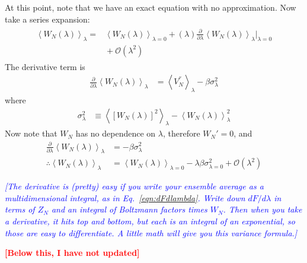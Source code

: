 \documentclass[letterpaper,twocolumn,amsmath,amssymb,prb]{revtex4-1}
\newcommand{\1}{\ensuremath{\textbf{r}_1}}
\newcommand{\2}{\ensuremath{\textbf{r}_2}}
\newcommand{\3}{\ensuremath{\textbf{r}_3}}
\newcommand{\4}{\ensuremath{\textbf{r}_4}}
\newcommand{\fixme}[1]{\textcolor{red}{\textbf{[#1]}}}
\newcommand{\davidsays}[1]{\textcolor{blue}{\textit{[#1]}}}
\begin{document}
At this point, note that we have an exact equation with no approximation. Now take a series expansion:
\begin{align}\begin{split} %
  \left\langle W_N(\lambda) \right\rangle_\lambda = &{} \left\langle W_N(\lambda)\right\rangle_{\lambda = 0} + (\lambda)\frac{\partial}{\partial\lambda}\left\langle W_N(\lambda) \right\rangle_{\lambda}\bigg|_{\lambda = 0} \\ &{} + \mathcal{O}(\lambda^2)
\end{split}\end{align}
The derivative term is
\begin{align}
  \frac{\partial}{\partial\lambda}\left\langle W_N(\lambda) \right\rangle_{\lambda} &= \left\langle V_N^{''} \right\rangle_\lambda - \beta\sigma_\lambda^2
\end{align}
where
\begin{align}
  \sigma_\lambda^2 &\equiv \left\langle \left[ W_N(\lambda) \right]^2 \right\rangle_\lambda - \left\langle W_N(\lambda) \right\rangle^2_\lambda
\end{align}
Now note that $W_N$ has no dependence on $\lambda$, therefore $W_N' = 0$, and
\begin{align}
  \frac{\partial}{\partial\lambda}\left\langle W_N(\lambda) \right\rangle_{\lambda} &= - \beta\sigma_\lambda^2 \\
  \therefore \left\langle W_N(\lambda) \right\rangle_\lambda &= \left\langle W_N(\lambda)\right\rangle_{\lambda = 0} - \lambda\beta\sigma_{\lambda=0}^2 + \mathcal{O}(\lambda^2)
\end{align}

\davidsays{The derivative is (pretty) easy if you write your ensemble
  average as a multidimensional integral, as in
  Eq.~\ref{eqn:dFdlambda}.  Write down $dF/d\lambda$ in terms of $Z_N$
  and an integral of Boltzmann factors times $W_N$.  Then when you
  take a derivative, it hits top and bottom, but each is an integral
  of an exponential, so those are easy to differentiate.  A little
  math will give you this variance formula.}

\fixme{Below this, I have not updated}
\end{document}
